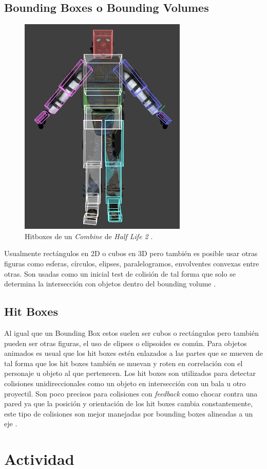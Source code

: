 \subsection{Bounding Boxes o Bounding Volumes}
\setlength\intextsep{0pt}
\begin{figure}
\includegraphics[width=\linewidth]{semana5/Hitbox.jpg}
\caption{Hitboxes de un \emph{Combine} de \emph{Half Life 2} \cite{valve_hit}.}
\label{fig:hitboxes}
\end{figure}
Usualmente rectángulos en 2D o cubos en 3D pero también es posible usar otras figuras como esferas, círculos, elipses, paralelogramos, envolventes convexas entre otras. Son usadas como un inicial test de colisión de tal forma que solo se determina la intersección con objetos dentro del bounding volume \cite{douglas_bbox}.
\subsection{Hit Boxes}
Al igual que un Bounding Box estos suelen ser cubos o rectángulos pero también pueden ser otras figuras, el uso de elipses o elipsoides es común. Para objetos animados es usual que los hit boxes estén enlazados a las partes que se mueven de tal forma que los hit boxes también se muevan y roten en correlación con el personaje u objeto al que pertenecen. Los hit boxes son utilizados para detectar colisiones unidireccionales como un objeto en intersección con un bala u otro proyectil. Son poco precisos para colisiones con \emph{feedback} como chocar contra una pared ya que la posición y orientación de los hit boxes cambia constantemente, este tipo de colisiones son mejor manejadas por bounding boxes alineadas a un eje \cite{valve_hit}. 

\section{Actividad}
